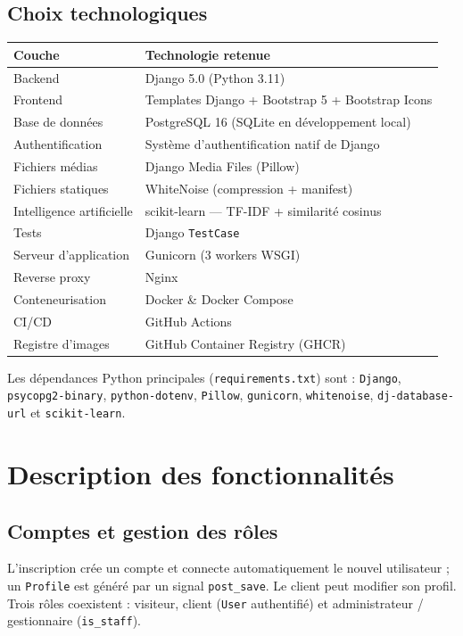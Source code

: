 \documentclass[11pt,a4paper]{report}
\begin{document}
\section{Choix technologiques}
\begin{center}
\renewcommand{\arraystretch}{1.25}
\begin{tabularx}{\linewidth}{@{}lX@{}}
\toprule
\textbf{Couche} & \textbf{Technologie retenue} \\
\midrule
Backend & Django 5.0 (Python 3.11) \\
Frontend & Templates Django + Bootstrap 5 + Bootstrap Icons \\
Base de données & PostgreSQL 16 (SQLite en développement local) \\
Authentification & Système d'authentification natif de Django \\
Fichiers médias & Django Media Files (Pillow) \\
Fichiers statiques & WhiteNoise (compression + manifest) \\
Intelligence artificielle & scikit-learn — TF-IDF + similarité cosinus \\
Tests & Django \texttt{TestCase} \\
Serveur d'application & Gunicorn (3 workers WSGI) \\
Reverse proxy & Nginx \\
Conteneurisation & Docker \& Docker Compose \\
CI/CD & GitHub Actions \\
Registre d'images & GitHub Container Registry (GHCR) \\
\bottomrule
\end{tabularx}
\end{center}

Les dépendances Python principales (\texttt{requirements.txt}) sont :
\texttt{Django}, \texttt{psycopg2-binary}, \texttt{python-dotenv}, \texttt{Pillow},
\texttt{gunicorn}, \texttt{whitenoise}, \texttt{dj-database-url} et
\texttt{scikit-learn}.

\chapter{Description des fonctionnalités}

\section{Comptes et gestion des rôles}
L'inscription crée un compte et connecte automatiquement le nouvel utilisateur ; un
\texttt{Profile} est généré par un signal \texttt{post\_save}. Le client peut
modifier son profil. Trois rôles coexistent : visiteur, client (\texttt{User}
authentifié) et administrateur / gestionnaire (\texttt{is\_staff}).
\end{document}
